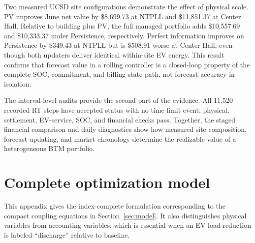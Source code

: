 \documentclass[final,5p,times]{elsarticle}
\begin{document}
Two measured UCSD site configurations demonstrate the effect of physical
scale. PV improves June net value by \$8,699.73 at NTPLL and \$11,851.37 at
Center Hall. Relative to building plus PV, the full managed portfolio adds
\$10,557.69 and \$10,333.37 under Persistence, respectively. Perfect
information improves on Persistence by \$349.43 at NTPLL but is \$508.91 worse
at Center Hall, even though both updaters deliver identical within-site EV
energy. This result confirms that forecast value in a rolling controller is a
closed-loop property of the complete SOC, commitment, and billing-state path,
not forecast accuracy in isolation.

The interval-level audits provide the second part of the evidence. All 11,520
recorded RT steps have accepted status with no time-limit event; physical,
settlement, EV-service, SOC, and financial checks pass. Together, the staged
financial comparison and daily diagnostics show how measured site composition,
forecast updating, and market chronology determine the realizable value of a
heterogeneous BTM portfolio.

\appendix

\section{Complete optimization model}
\label{app:complete_model}

This appendix gives the index-complete formulation corresponding to the compact
coupling equations in Section~\ref{sec:model}. It also distinguishes physical
variables from accounting variables, which is essential when an EV load
reduction is labeled ``discharge'' relative to baseline.
\end{document}
